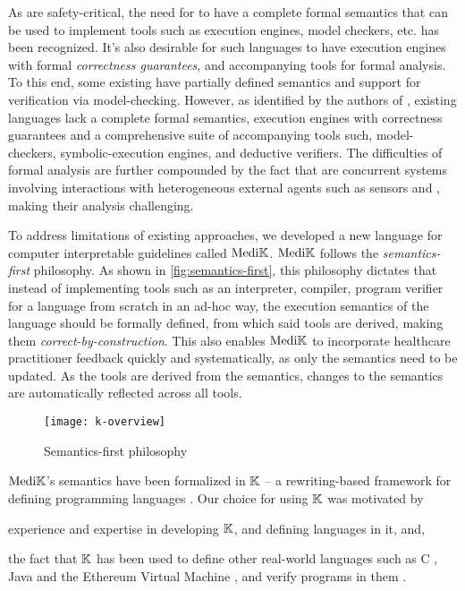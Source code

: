 As \CDSSs{} are safety-critical, the need for \CIG{} \DSLs{} to
have a complete formal semantics that can be used to implement tools such as
execution engines, model checkers, etc. has been recognized.
It's also desirable for such languages to have execution engines with formal \emph{correctness
guarantees}, and accompanying tools for formal analysis.
To this end, some existing \DSLs{} have partially defined semantics and
support for verification via model-checking.
However, as identified by the authors of \cite{SuttonAMIA03, ShaharAMIA96},
existing languages lack a complete formal semantics,
execution engines with correctness guarantees
and a comprehensive suite of accompanying tools such, model-checkers, symbolic-execution
engines, and deductive verifiers.
The difficulties of formal analysis are further compounded
by the fact that \CDSSs{} are concurrent systems involving interactions with
heterogeneous external agents such as sensors and \HCPs{}, making their analysis challenging.

To address limitations of existing approaches, we developed a new language
for computer interpretable guidelines called $\text{Medi}\mathbb{K}{}$. $\text{Medi}\mathbb{K}{}$ follows
the \emph{semantics-first} philosophy. As shown in \autoref{fig:semantics-first}, this philosophy dictates that instead of
implementing tools such as an interpreter,
compiler, program verifier for a language from scratch in an ad-hoc way,
the execution semantics of the language should be formally defined, from which
said tools are derived, making them \emph{correct-by-construction}.
This also enables $\text{Medi}\mathbb{K}{}$ to incorporate healthcare practitioner feedback
quickly and systematically, as only the
semantics need to be updated. As the tools are derived from the semantics,
changes to the semantics are automatically reflected across all tools.

\begin{figure}[t!]
  \centering
  \texttt{[image: k-overview]}
  \caption{Semantics-first philosophy}\label{fig:semantics-first}
\end{figure}


$\text{Medi}\mathbb{K}{}{}$'s semantics have been formalized in $\mathbb{K}$ -- a rewriting-based
framework for defining programming languages \cite{KframeworkUrl}. Our
choice for using $\mathbb{K}$ was motivated by
\begin{enumerate*}[label=(\alph*)]
  \item experience and expertise in developing $\mathbb{K}$, and defining languages in
    it, and,
  \item the fact that $\mathbb{K}$ has been used to define other real-world languages such as C
    \cite{HathhornPLDI15}, Java \cite{BogdanasPOPL15} and the Ethereum Virtual
    Machine \cite{HildenbrandtCSF18}, and verify programs in them
    \cite{ParkFSE18,StefanescuOOPSLA16}.
\end{enumerate*}

